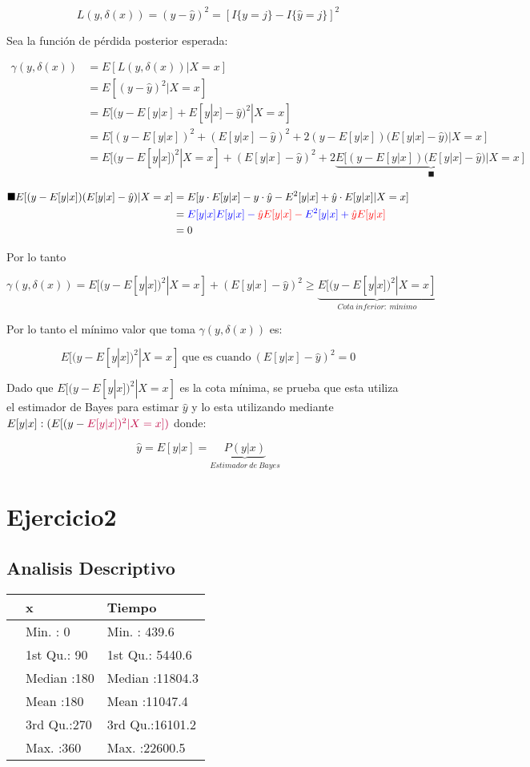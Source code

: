\documentclass[
  12pt,
  letterpaper,
]{article}
\begin{document}
\[ L(y,\delta(x)) = (y-\hat{y})^2 = [I\{y=j\}-I\{\hat{y}=j\}]^2 \]

Sea la función de pérdida posterior esperada:

\[
\begin{aligned}
\gamma(y,\delta(x)) & = E[L(y,\delta(x))|X=x]\\
& = E[(y-\hat{y})^2|X=x]\\
& = E[(y-E[y|x]+E[y|x]-\hat{y})^2|X=x]\\
& = E[(y-E[y|x])^2 + (E[y|x]-\hat{y})^2 + 2(y-E[y|x])(E[y|x]-\hat{y})|X=x]\\
& = E[(y-E[y|x])^2|X=x]+(E[y|x]-\hat{y})^2 + 2 
\underbrace{E[(y-E[y|x])(E[y|x]-\hat{y})|X=x]}_{\blacksquare}
\end{aligned}
\]

\[
\begin{aligned}
\blacksquare E[(y-E[y|x])(E[y|x]-\hat{y})|X=x] & = E[y \cdot E[y|x] - y\cdot\hat{y}-E^2[y|x] + \hat{y} \cdot E[y|x]|X=x]\\
& = \color{blue}{E[y|x]E[y|x]} - \color{red}{\hat{y}E[y|x]}-\color{blue}{E^2[y|x]} + \color{red}{\hat{y}E[y|x]}\\
& = 0
\end{aligned}
\]

Por lo tanto

\[\gamma(y, \delta(x))  = E[(y-E[y|x])^2|X=x]+(E[y|x]-\hat{y})^2
\geq \underbrace{E[(y-E[y|x])^2|X=x]}_{Cota~inferior:~mínimo}\]

Por lo tanto el mínimo valor que toma \(\gamma(y, \delta(x))\) es:

\[E[(y-E[y|x])^2|X=x] ~ \text{que es cuando}~ (E[y|x]-\hat{y})^2 = 0\]

Dado que \(E[(y-E[y|x])^2|X=x]\) es la cota mínima, se prueba que esta
utiliza el estimador de Bayes para estimar \(\hat{y}\) y lo esta
utilizando mediante \(E[y|x]: (E[(y- \color{purple}{E[y|x]})^2|X=x])\)
donde:

\[\widehat{y}=E[y|x]=\underbrace{P(y|x)}_{Estimador ~ de~  Bayes}\]

\section{Ejercicio2}
\subsection{Analisis Descriptivo}

\begin{tabular}{l|l|l}
\hline
  & x & Tiempo\\
\hline
 & Min.   :  0 & Min.   :  439.6\\
\hline
 & 1st Qu.: 90 & 1st Qu.: 5440.6\\
\hline
 & Median :180 & Median :11804.3\\
\hline
 & Mean   :180 & Mean   :11047.4\\
\hline
 & 3rd Qu.:270 & 3rd Qu.:16101.2\\
\hline
 & Max.   :360 & Max.   :22600.5\\
\hline
\end{tabular}
\end{document}

